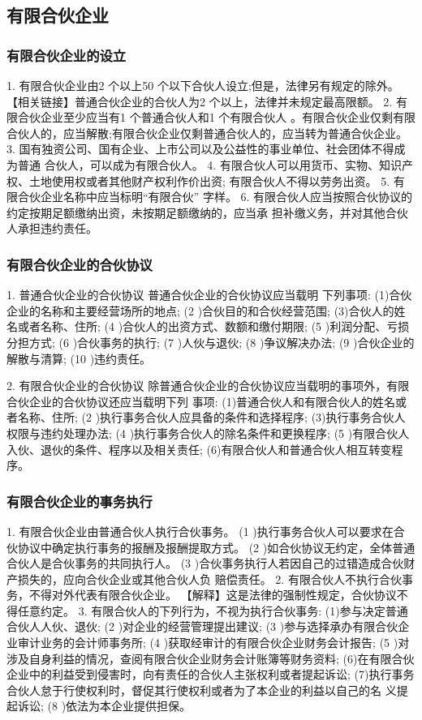 \documentclass[UTF8,12pt]{ctexart}
\numberwithin{equation}{section} %
\numberwithin{figure}{section}
\numberwithin{table}{section}
\begin{document}
	
	\subsection{有限合伙企业}
	
	\subsubsection{有限合伙企业的设立}
	1. 有限合伙企业由2 个以上50 个以下合伙人设立;但是，法律另有规定的除外。
	【相关链接】普通合伙企业的合伙人为2 个以上，法律并未规定最高限额。
	2. 有限合伙企业至少应当有1 个普通合伙人和1 个有限合伙人 。有限合伙企业仅剩有限 合伙人的，应当解散;有限合伙企业仅剩普通合伙人的，应当转为普通合伙企业。
	3. 国有独资公司、国有企业、上市公司以及公益性的事业单位、社会团体不得成为普通 合伙人，可以成为有限合伙人。
	4. 有限合伙人可以用货币、实物、知识产权、土地使用权或者其他财产权利作价出资; 有限合伙人不得以劳务出资。
	5. 有限合伙企业名称中应当标明“有限合伙” 字样。
	6. 有限合伙人应当按照合伙协议的约定按期足额缴纳出资，未按期足额缴纳的，应当承 担补缴义务，并对其他合伙人承担违约责任。
	
	
	\subsubsection{有限合伙企业的合伙协议}
	1. 普通合伙企业的合伙协议
	普通合伙企业的合伙协议应当载明 下列事项: (1)合伙企业的名称和主要经营场所的地点;
	(2 )合伙目的和合伙经营范围;
	(3)合伙人的姓名或者名称、住所;
	(4 )合伙人的出资方式、数额和缴付期限;
	(5 )利润分配、亏损分担方式;
	(6 )合伙事务的执行;
	(7 )人伙与退伙;
	(8 )争议解决办法;
	(9 )合伙企业的解散与清算;
	(10 )违约责任。
	
	
	2. 有限合伙企业的合伙协议 除普通合伙企业的合伙协议应当载明的事项外，有限合伙企业的合伙协议还应当载明下列 事项:
	(1)普通合伙人和有限合伙人的姓名或者名称、住所;
	(2 )执行事务合伙人应具备的条件和选择程序; (3)执行事务合伙人权限与违约处理办法;
	(4 )执行事务合伙人的除名条件和更换程序;
	(5 )有限合伙人入伙、退伙的条件、程序以及相关责任; (6)有限合伙人和普通合伙人相互转变程序。
	
	\subsubsection{有限合伙企业的事务执行}
	1. 有限合伙企业由普通合伙人执行合伙事务。
	(1 )执行事务合伙人可以要求在合伙协议中确定执行事务的报酬及报酬提取方式。
	(2 )如合伙协议无约定，全体普通合伙人是合伙事务的共同执行人。
	(3 )合伙事务执行人若因自己的过错造成合伙财产损失的，应向合伙企业或其他合伙人负 赔偿责任。
	2. 有限合伙人不执行合伙事务，不得对外代表有限合伙企业。
	【解释】这是法律的强制性规定，合伙协议不得任意约定。
	3. 有限合伙人的下列行为，不视为执行合伙事务: (1)参与决定普通合伙人人伙、退伙;
	(2 )对企业的经营管理提出建议;
	(3 )参与选择承办有限合伙企业审计业务的会计师事务所;
	(4 )获取经审计的有限合伙企业财务会计报告;
	(5 )对涉及自身利益的情况，查阅有限合伙企业财务会计账簿等财务资料; (6)在有限合伙企业中的利益受到侵害时，向有责任的合伙人主张权利或者提起诉讼; (7)执行事务合伙人怠于行使权利时，督促其行使权利或者为了本企业的利益以自己的名 义提起诉讼;
	(8 )依法为本企业提供担保。
	
\end{document}
